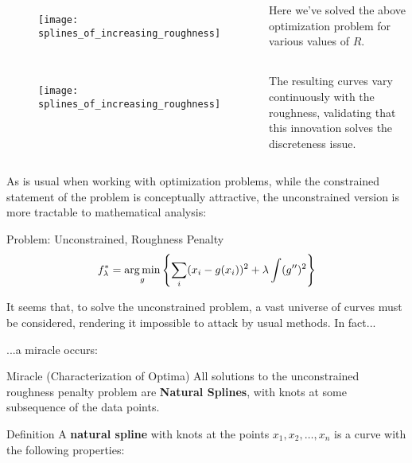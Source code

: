 %
%
\begin{frame}
  \begin{columns}
      \begin{figure}
        \texttt{[image: splines\_of\_increasing\_roughness]}
      \end{figure}
      Here we've solved the above optimization problem for various values of $R$.
  \end{columns}
\end{frame}
%
%
\begin{frame}
  \begin{columns}
      \begin{figure}
        \texttt{[image: splines\_of\_increasing\_roughness]}
      \end{figure}
      The resulting curves vary continuously with the roughness, validating that this innovation solves the discreteness issue.
  \end{columns}
\end{frame}
%
%
\begin{frame}
  As is usual when working with optimization problems, while the constrained statement of the problem is conceptually attractive, the unconstrained version is more tractable to mathematical analysis:
  \begin{block}{Problem: Unconstrained, Roughness Penalty}
    $$ f_{\lambda}^* = \operatorname*{arg\,min}_{g} \left\{ \sum_i (x_i - g(x_i))^2 + \lambda \int (g'')^2 \right\} $$
  \end{block}
\end{frame}
%
%
\begin{frame}
  It seems that, to solve the unconstrained problem, a vast universe of curves must be considered, rendering it impossible to attack by usual methods.  In fact...
\end{frame}
%
%
\begin{frame}
  ...a miracle occurs:
  \begin{block}{Miracle (Characterization of Optima)}
    All solutions to the unconstrained roughness penalty problem are \textbf{Natural Splines},
with knots at some subsequence of the data points.
  \end{block}

\end{frame}
%
%
\begin{frame}
  \begin{block}{Definition}
    A \textbf{natural spline} with knots at the points $x_1, x_2, \ldots, x_n$ is a curve with the following properties:
  \end{block}
\end{frame}
